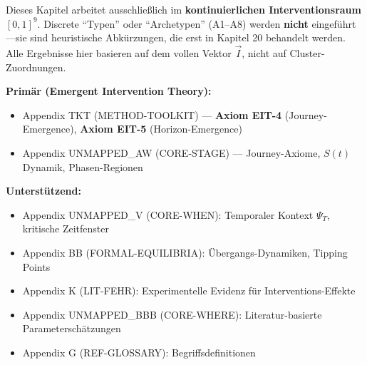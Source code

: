 \begin{tcolorbox}[colback=red!5!white, colframe=red!75!black,
    title=\textbf{Wichtig: Keine diskreten Typen in diesem Kapitel}]
Dieses Kapitel arbeitet ausschließlich im \textbf{kontinuierlichen Interventionsraum} $[0,1]^9$.
Discrete ``Typen'' oder ``Archetypen'' (A1--A8) werden \textbf{nicht} eingeführt---sie sind
heuristische Abkürzungen, die erst in Kapitel 20 behandelt werden. Alle Ergebnisse hier
basieren auf dem vollen Vektor $\vec{I}$, nicht auf Cluster-Zuordnungen.
\end{tcolorbox}

\begin{tcolorbox}[colback=yellow!10!white, colframe=orange!75!black,
    title=Appendix References for This Chapter]

\textbf{Primär (Emergent Intervention Theory):}
\begin{itemize}[nosep]
\item Appendix TKT (METHOD-TOOLKIT) --- \textbf{Axiom EIT-4} (Journey-Emergence), \textbf{Axiom EIT-5} (Horizon-Emergence)
\item Appendix UNMAPPED_AW (CORE-STAGE) --- Journey-Axiome, $S(t)$ Dynamik, Phasen-Regionen
\end{itemize}

\textbf{Unterstützend:}
\begin{itemize}[nosep]
\item Appendix UNMAPPED_V (CORE-WHEN): Temporaler Kontext $\Psi_T$, kritische Zeitfenster
\item Appendix BB (FORMAL-EQUILIBRIA): Übergangs-Dynamiken, Tipping Points
\item Appendix K (LIT-FEHR): Experimentelle Evidenz für Interventions-Effekte
\item Appendix UNMAPPED_BBB (CORE-WHERE): Literatur-basierte Parameterschätzungen
\item Appendix G (REF-GLOSSARY): Begriffsdefinitionen
\end{itemize}
\end{tcolorbox}

